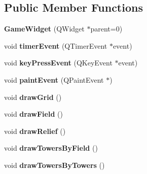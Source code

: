 \subsection*{Public Member Functions}
\begin{DoxyCompactItemize}
\item 
\hypertarget{class_game_widget_af02a124557d71b9a4b7388c452cb540b}{}{\bfseries Game\+Widget} (Q\+Widget $\ast$parent=0)\label{class_game_widget_af02a124557d71b9a4b7388c452cb540b}

\item 
\hypertarget{class_game_widget_a47a187d96dcc0f90d1ddaab764e8cab2}{}void {\bfseries timer\+Event} (Q\+Timer\+Event $\ast$event)\label{class_game_widget_a47a187d96dcc0f90d1ddaab764e8cab2}

\item 
\hypertarget{class_game_widget_a13b69687699966d57a7edeab5ba69824}{}void {\bfseries key\+Press\+Event} (Q\+Key\+Event $\ast$event)\label{class_game_widget_a13b69687699966d57a7edeab5ba69824}

\item 
\hypertarget{class_game_widget_a60c6784564a229b8202c6e636e2d4cbd}{}void {\bfseries paint\+Event} (Q\+Paint\+Event $\ast$)\label{class_game_widget_a60c6784564a229b8202c6e636e2d4cbd}

\item 
\hypertarget{class_game_widget_a8b3d0e57446302b4e1cb2587b3318012}{}void {\bfseries draw\+Grid} ()\label{class_game_widget_a8b3d0e57446302b4e1cb2587b3318012}

\item 
\hypertarget{class_game_widget_aa88f6a6b0be09f11f9dc04e554af7495}{}void {\bfseries draw\+Field} ()\label{class_game_widget_aa88f6a6b0be09f11f9dc04e554af7495}

\item 
\hypertarget{class_game_widget_adea8b502ef51ff6ab4ee5c78d677b418}{}void {\bfseries draw\+Relief} ()\label{class_game_widget_adea8b502ef51ff6ab4ee5c78d677b418}

\item 
\hypertarget{class_game_widget_ab1e1886294a2dd34c845a9c3e7006d51}{}void {\bfseries draw\+Towers\+By\+Field} ()\label{class_game_widget_ab1e1886294a2dd34c845a9c3e7006d51}

\item 
\hypertarget{class_game_widget_a2b5ef66669228fab4d18f9d12ee85807}{}void {\bfseries draw\+Towers\+By\+Towers} ()\label{class_game_widget_a2b5ef66669228fab4d18f9d12ee85807}


\end{DoxyCompactItemize}
